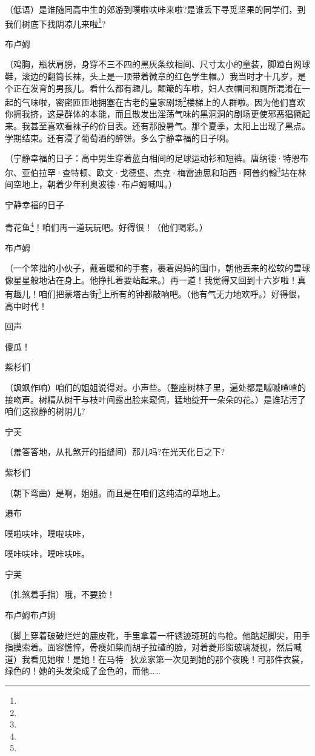 \par （低语）是谁随同高中生的郊游到噗啦呋咔来啦?是谁丢下寻觅坚果的同学们，到我们树底下找阴凉儿来啦\footnote{}?
\par 布卢姆
\par （鸡胸，瓶状肩膀，身穿不三不四的黑灰条纹相间、尺寸太小的童装，脚蹬白网球鞋，滚边的翻筒长袜，头上是一顶带着徽章的红色学生帽。）我当时才十几岁，是个正在发育的男孩儿。看什么都有趣儿。颠簸的车啦，妇人衣帽间和厕所混淆在一起的气味啦，密密匝匝地拥塞在古老的皇家剧场\footnote{}楼梯上的人群啦。因为他们喜欢你拥我挤，这是群体的本能，而且散发出淫荡气味的黑洞洞的剧场更使邪恶猖獗起来。我甚至喜欢看袜子的价目表。还有那股暑气。那个夏季，太阳上出现了黑点。学期结束。还有浸了葡萄酒的醉饼。多么宁静幸福的日子啊。
\par （宁静幸福的日子：高中男生穿着蓝白相间的足球运动衫和短裤。唐纳德·特恩布尔、亚伯拉罕·查特顿、欧文·戈德堡、杰克·梅雷迪思和珀西·阿普约翰\footnote{}站在林间空地上，朝着少年利奥波德·布卢姆喊叫。）
\par 宁静幸福的日子
\par 青花鱼\footnote{}！咱们再一道玩玩吧。好得很！（他们喝彩。）
\par 布卢姆
\par （一个笨拙的小伙子，戴着暖和的手套，裹着妈妈的围巾，朝他丢来的松软的雪球像星星般地沾在身上。他挣扎着要站起来。）再一道！我觉得又回到十六岁啦！真有趣儿！咱们把蒙塔古街\footnote{}上所有的钟都敲响吧。（他有气无力地欢呼。）好得很，高中时代！
\par 回声
\par 傻瓜！
\par 紫杉们
\par （飒飒作响）咱们的姐姐说得对。小声些。（整座树林子里，遍处都是嘁嘁喳喳的接吻声。树精从树干与枝叶间露出脸来窥伺，猛地绽开一朵朵的花。）是谁玷污了咱们这寂静的树阴儿?
\par 宁芙
\par （羞答答地，从扎煞开的指缝间）那儿吗?在光天化日之下?
\par 紫杉们
\par （朝下弯曲）是啊，姐姐。而且是在咱们这纯洁的草地上。
\par 瀑布
\par 噗啦呋咔，噗啦呋咔，
\par 噗咔呋咔，噗咔呋咔。
\par 宁芙
\par （扎煞着手指）哦，不要脸！
\par 布卢姆布卢姆
\par （脚上穿着破破烂烂的鹿皮靴，手里拿着一杆锈迹斑斑的鸟枪。他踮起脚尖，用手指摸索着。面容憔悴，骨瘦如柴而胡子拉碴的脸，对着菱形窗玻璃凝视，然后喊道）我看见她啦！是她！在马特·狄龙家第一次见到她的那个夜晚！可那件衣裳，绿色的！她的头发染成了金色的，而他……
